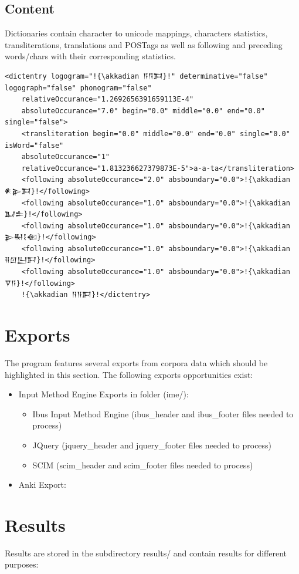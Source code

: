 \documentclass[10pt,a4paper,titlepage]{report}
\begin{document}
	\subsection{Content}
	Dictionaries contain character to unicode mappings, characters statistics, transliterations, translations and POSTags as well as following and preceding words/chars with their corresponding statistics.
	\begin{lstlisting}[caption=Dictionary Contents,escapechar=!]
	<dictentry logogram="!{\akkadian 𒀀𒀀𒁕}!" determinative="false" logograph="false" phonogram="false" 
	relativeOccurance="1.2692656391659113E-4"
	absoluteOccurance="7.0" begin="0.0" middle="0.0" end="0.0" single="false">
	<transliteration begin="0.0" middle="0.0" end="0.0" single="0.0" isWord="false" 
	absoluteOccurance="1"
	relativeOccurance="1.813236627379873E-5">a-a-ta</transliteration>
	<following absoluteOccurance="2.0" absboundary="0.0">!{\akkadian 𒀭𒉌𒁕}!</following>
	<following absoluteOccurance="1.0" absboundary="0.0">!{\akkadian 𒆏𒉺}!</following>
	<following absoluteOccurance="1.0" absboundary="0.0">!{\akkadian 𒉌𒊑𒋙𒈿}!</following>
	<following absoluteOccurance="1.0" absboundary="0.0">!{\akkadian 𒍝𒇥𒌨𒁕}!</following>
	<following absoluteOccurance="1.0" absboundary="0.0">!{\akkadian 𒐼𒀀}!</following>
	!{\akkadian 𒀀𒀀𒁕}!</dictentry>
	\end{lstlisting}  
	\section{Exports}
	\label{sec:exports}
	The program features several exports from corpora data which should be highlighted in this section. The following exports opportunities exist:
	\begin{itemize}
		\item Input Method Engine Exports in folder (ime/):\begin{itemize}
			\item Ibus Input Method Engine (ibus\_header and ibus\_footer files needed to process)
			\item JQuery (jquery\_header and jquery\_footer files needed to process)
			\item SCIM (scim\_header and scim\_footer files needed to process)
		\end{itemize}
		\item Anki Export:
	\end{itemize}
	\section{Results}
	Results are stored in the subdirectory results/ and contain results for different purposes:
\end{document}
